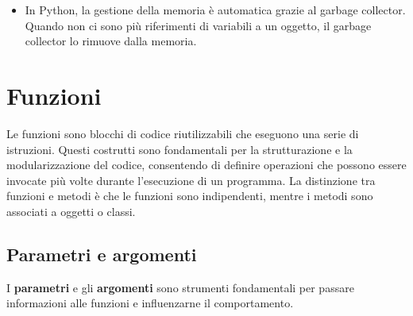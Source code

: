 \documentclass[
  letterpaper,
]{scrbook}
\providecommand{\tightlist}{%
  \setlength{\itemsep}{0pt}\setlength{\parskip}{0pt}}\usepackage{longtable,booktabs,array}
\newcommand*\circled[1]{\tikz[baseline=(char.base)]{
          \node[shape=circle,draw,inner sep=1pt] (char) {{\scriptsize#1}};}}
\begin{document}
\begin{itemize}
\item
  In Python, la gestione della memoria è automatica grazie al garbage
  collector. Quando non ci sono più riferimenti di variabili a un
  oggetto, il garbage collector lo rimuove dalla memoria.
\end{itemize}

\section{Funzioni}\label{funzioni}

Le funzioni sono blocchi di codice riutilizzabili che eseguono una serie
di istruzioni. Questi costrutti sono fondamentali per la strutturazione
e la modularizzazione del codice, consentendo di definire operazioni che
possono essere invocate più volte durante l'esecuzione di un programma.
La distinzione tra funzioni e metodi è che le funzioni sono
indipendenti, mentre i metodi sono associati a oggetti o classi.

\subsection{Parametri e argomenti}\label{parametri-e-argomenti}

I \textbf{parametri} e gli \textbf{argomenti} sono strumenti
fondamentali per passare informazioni alle funzioni e influenzarne il
comportamento.
\end{document}
